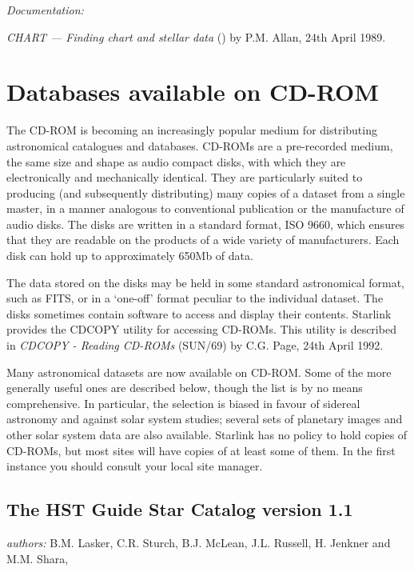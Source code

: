 \documentclass[twoside,11pt,nolof]{starlink}
\begin{document}
\textit{Documentation:}

\textit{CHART --- Finding chart and stellar data}
() by P.M. Allan,
24th April 1989.


\section{Databases available on CD-ROM
}

The CD-ROM is becoming an increasingly popular medium for distributing
astronomical catalogues and databases. CD-ROMs are a pre-recorded
medium, the same size and shape as audio compact disks, with which they
are electronically and mechanically identical. They are particularly
suited to producing (and subsequently distributing) many copies of a
dataset from a single master, in a manner analogous to conventional
publication or the manufacture of audio disks. The disks are written
in a standard format, ISO 9660, which ensures that they are readable
on the products of a wide variety of manufacturers. Each disk can hold
up to approximately 650Mb of data.

The data stored on the disks may be held in some standard astronomical
format, such as FITS, or in a `one-off' format peculiar to the
individual dataset. The disks sometimes contain software to access and
display their contents. Starlink provides the CDCOPY utility for
accessing CD-ROMs. This utility is described in \textit{CDCOPY - Reading
CD-ROMs}
(SUN/69) by C.G. Page, 24th April 1992.

Many astronomical datasets are now available on CD-ROM. Some of the more
generally useful ones are described below, though the list is by no
means comprehensive. In particular, the selection is biased in favour of
sidereal astronomy and against solar system studies; several sets of
planetary images and other solar system data are also available.
Starlink has no policy to hold copies of CD-ROMs, but most sites will
have copies of at least some of them. In the first instance you should
consult your local site manager.

\subsection{The HST Guide Star Catalog version 1.1
\label{GSC}}

\textit{authors:} B.M. Lasker, C.R. Sturch, B.J. McLean, J.L. Russell,
H. Jenkner and M.M. Shara,
\end{document}
